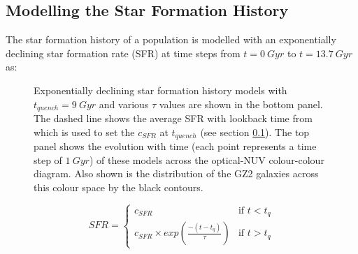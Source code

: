 \documentclass{mn2e}
\begin{document}
\subsection{Modelling the Star Formation History}\label{sfh}
The star formation history of a population is modelled with an exponentially declining star formation rate (SFR) at time steps from $t =0 ~Gyr$ to $t=13.7 ~Gyr$ as:

\begin{figure}
\caption{Exponentially declining star formation history models with $t_{quench}=9~Gyr$ and various $\tau$ values are shown in the bottom panel. The dashed line shows the average SFR with lookback time from \cite{Peng} which is used to set the $c_{SFR}$ at $t_{quench}$ (see section \ref{sfh}). The top panel shows the evolution with time (each point represents a time step of $1 ~Gyr$) of these models across the optical-NUV colour-colour diagram. Also shown is the distribution of the GZ2 galaxies across this colour space by the black contours.}
\label{kev}
\end{figure}


\[
SFR = 
\begin{cases}
c_{SFR} & \text{if } t < t_{q} \\
c_{SFR} \times exp{\left( \frac{-(t-t_{q})}{\tau}\right)} & \text{if } t > t_{q}
\end{cases}
\]
\end{document}

